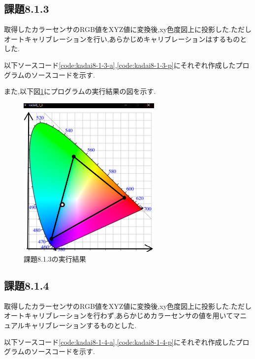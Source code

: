 \documentclass{jarticle}
\begin{document}
\subsection{課題8.1.3}
取得したカラーセンサのRGB値をXYZ値に変換後,xy色度図上に投影した.ただしオートキャリブレーションを行い,あらかじめキャリブレーションはするものとした.


以下ソースコード\ref{code:kadai8-1-3-a},\ref{code:kadai8-1-3-p}にそれぞれ作成したプログラムのソースコードを示す.





また,以下図\ref{fig:kadai8-1-3}にプログラムの実行結果の図を示す.

\begin{figure}[H]
\begin{center}
\includegraphics[width=7.0cm]{images/kadai8-1-3.png}
\caption{課題8.1.3の実行結果}
\label{fig:kadai8-1-3}
\end{center}
\end{figure}

\subsection{課題8.1.4}
取得したカラーセンサのRGB値をXYZ値に変換後,xy色度図上に投影した.ただしオートキャリブレーションを行わず,あらかじめカラーセンサの値を用いてマニュアルキャリブレーションするものとした.


以下ソースコード\ref{code:kadai8-1-4-a},\ref{code:kadai8-1-4-p}にそれぞれ作成したプログラムのソースコードを示す.


\end{document}
